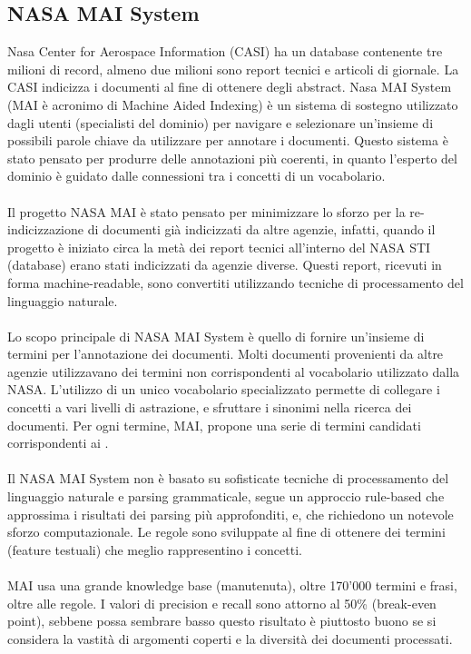 \documentclass{article}
\theoremstyle{plain}
\theoremstyle{definition}
\begin{document}
\subsection{NASA MAI System}
Nasa Center for Aerospace Information (CASI) ha un database contenente tre milioni di record, almeno due milioni sono report tecnici e articoli di giornale. La CASI indicizza i documenti al fine di ottenere degli abstract. Nasa MAI System (MAI è acronimo di Machine Aided Indexing) è un sistema di sostegno utilizzato dagli utenti (specialisti del dominio) per navigare e selezionare un'insieme di possibili parole chiave da utilizzare per annotare i documenti.
Questo sistema è stato pensato per produrre delle annotazioni più coerenti, in quanto l'esperto del dominio è guidato dalle connessioni tra i concetti di un vocabolario. 
\\
\\
Il progetto NASA MAI è stato pensato per minimizzare lo sforzo per la re-indicizzazione di documenti già indicizzati da altre agenzie, infatti, quando il progetto è iniziato circa la metà dei report tecnici all'interno del NASA STI (database) erano stati indicizzati da agenzie diverse.  
Questi report, ricevuti in forma machine-readable, sono convertiti utilizzando tecniche di processamento del linguaggio naturale.
\\
\\
Lo scopo principale di NASA MAI System è quello di fornire un'insieme di termini  per l'annotazione dei documenti. Molti documenti provenienti da altre agenzie utilizzavano dei termini non corrispondenti al vocabolario utilizzato dalla NASA. L'utilizzo di un unico vocabolario specializzato permette di collegare i concetti a vari livelli di astrazione, e sfruttare i sinonimi nella ricerca dei documenti. Per ogni termine, MAI, propone una serie di termini candidati corrispondenti ai .  
\\
\\
Il NASA MAI System non è basato su sofisticate tecniche di processamento del linguaggio naturale e parsing grammaticale, segue un approccio rule-based che approssima i risultati dei parsing più approfonditi, e, che richiedono un notevole sforzo computazionale. Le regole sono sviluppate al fine di ottenere dei termini (feature testuali) che meglio rappresentino i concetti.
\\
\\
MAI usa una grande knowledge base (manutenuta), oltre 170'000 termini e frasi, oltre alle regole. I valori di precision e recall sono attorno al 50\% (break-even point), sebbene possa sembrare basso questo risultato è piuttosto buono se si considera la vastità di argomenti coperti e la diversità dei documenti processati.
\end{document}
